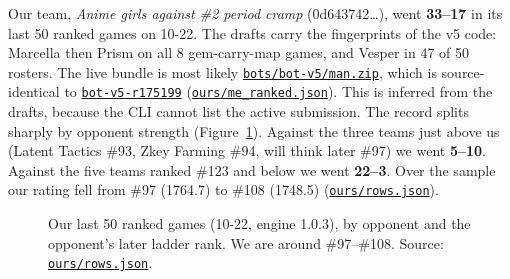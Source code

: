 \documentclass[11pt,a4paper]{article}
\newcommand{\scratch}{file:///private/tmp/claude-501/-Users-tristanbasri-Desktop-Code-cambridge-battlecode-s2/b3f4cb6b-e46a-405f-957c-42c44c05c8dc/scratchpad/ladder-data}
\newcommand{\repo}{file:///Users/tristanbasri/Desktop/Code/cambridge-battlecode-s2}
\newcommand{\src}[2]{{\small(\href{#1}{\textcolor{cTop}{\texttt{#2}}})}}
\newcommand{\code}[2]{\href{\repo/#1}{\texttt{\textcolor{cOurs!80!black}{#2}}}}
\newcommand{\vfive}{bots/bot-v5-r175199/src}
\begin{document}
Our team, \emph{Anime girls against \#2 period cramp} (0d643742\ldots), went \textbf{33--17} in its last 50 ranked games on 10-22. The drafts carry the fingerprints of the v5 code: Marcella then Prism on all 8 gem-carry-map games, and Vesper in 47 of 50 rosters. The live bundle is most likely \code{bots/bot-v5/man.zip}{bots/bot-v5/man.zip}, which is source-identical to \code{\vfive}{bot-v5-r175199} \src{\scratch/ours/me_ranked.json}{ours/me\_ranked.json}. This is inferred from the drafts, because the CLI cannot list the active submission. The record splits sharply by opponent strength (Figure~\ref{fig:record}). Against the three teams just above us (Latent Tactics \#93, Zkey Farming \#94, will think later \#97) we went \textbf{5--10}. Against the five teams ranked \#123 and below we went \textbf{22--3}. Over the sample our rating fell from \#97 (1764.7) to \#108 (1748.5) \src{\scratch/ours/rows.json}{ours/rows.json}.

\begin{figure}[H]
\centering
{}
\caption{Our last 50 ranked games (10-22, engine 1.0.3), by opponent and the opponent's later ladder rank. We are around \#97--\#108. Source: \href{\scratch/ours/rows.json}{\texttt{ours/rows.json}}.}
\label{fig:record}
\end{figure}
\end{document}
